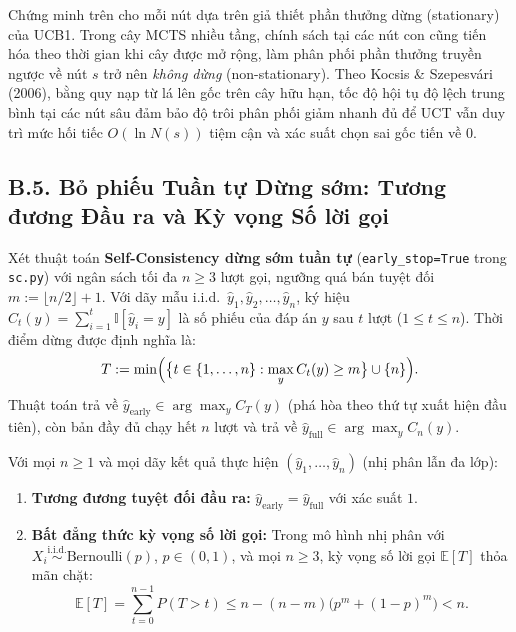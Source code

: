 \begin{remark}
Chứng minh trên cho mỗi nút dựa trên giả thiết phần thưởng dừng (stationary) của UCB1. Trong cây MCTS nhiều tầng, chính sách tại các nút con cũng tiến hóa theo thời gian khi cây được mở rộng, làm phân phối phần thưởng truyền ngược về nút $s$ trở nên \emph{không dừng} (non-stationary). Theo Kocsis \& Szepesvári (2006), bằng quy nạp từ lá lên gốc trên cây hữu hạn, tốc độ hội tụ độ lệch trung bình tại các nút sâu đảm bảo độ trôi phân phối giảm nhanh đủ để UCT vẫn duy trì mức hối tiếc $O(\ln N(s))$ tiệm cận và xác suất chọn sai gốc tiến về $0$.
\end{remark}

\subsection{B.5. Bỏ phiếu Tuần tự Dừng sớm: Tương đương Đầu ra và Kỳ vọng Số lời gọi}
\label{subsec:b5-early-stop}

Xét thuật toán \textbf{Self-Consistency dừng sớm tuần tự} (\texttt{early\_stop=True} trong \texttt{sc.py}) với ngân sách tối đa $n \ge 3$ lượt gọi, ngưỡng quá bán tuyệt đối $m := \lfloor n/2 \rfloor + 1$. Với dãy mẫu i.i.d.\ $\hat{y}_1, \hat{y}_2, \dots, \hat{y}_n$, ký hiệu $C_t(y) = \sum_{i=1}^t \mathbb{I}[\hat{y}_i = y]$ là số phiếu của đáp án $y$ sau $t$ lượt ($1 \le t \le n$). Thời điểm dừng được định nghĩa là:
\[
  T := \min\Bigl(\bigl\{t \in \{1, \dots, n\} : \max_y C_t(y) \ge m\bigr\} \cup \{n\}\Bigr).
\]
Thuật toán trả về $\hat{y}_{\text{early}} \in \arg\max_y C_T(y)$ (phá hòa theo thứ tự xuất hiện đầu tiên), còn bản đầy đủ chạy hết $n$ lượt và trả về $\hat{y}_{\text{full}} \in \arg\max_y C_n(y)$.

\begin{theorem}
\label{thm:b5-early-stop}
Với mọi $n \ge 1$ và mọi dãy kết quả thực hiện $(\hat{y}_1, \dots, \hat{y}_n)$ (nhị phân lẫn đa lớp):
\begin{enumerate}
  \item \textbf{Tương đương tuyệt đối đầu ra:} $\hat{y}_{\text{early}} = \hat{y}_{\text{full}}$ với xác suất $1$.
  \item \textbf{Bất đẳng thức kỳ vọng số lời gọi:} Trong mô hình nhị phân với $X_i \stackrel{\text{i.i.d.}}{\sim} \text{Bernoulli}(p)$, $p \in (0, 1)$, và mọi $n \ge 3$, kỳ vọng số lời gọi $\mathbb{E}[T]$ thỏa mãn chặt:
  \begin{equation}
    \mathbb{E}[T] = \sum_{t=0}^{n-1} P(T > t) \le n - (n - m)\bigl(p^m + (1 - p)^m\bigr) < n.
    \label{eq:b5-expected-calls}
  \end{equation}
\end{enumerate}
\end{theorem}

